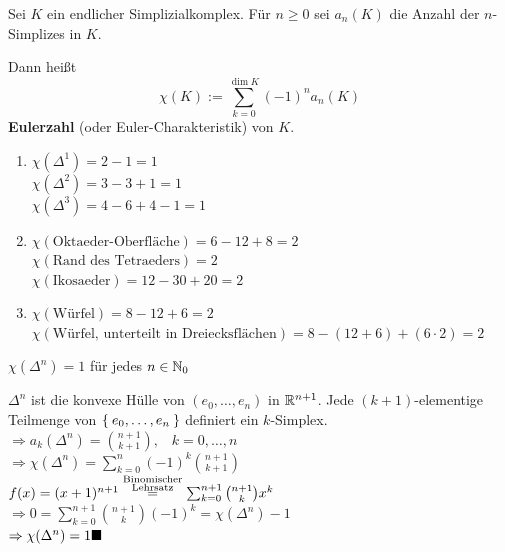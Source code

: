 \begin{definition}
    Sei $K$ ein endlicher Simplizialkomplex. Für $n \geq 0$ sei
    $a_n(K)$ die Anzahl der $n$-Simplizes in $K$.

    Dann heißt 
    \[\chi(K) := \sum_{k=0}^{\dim K} (-1)^n a_n(K)\]
    \textbf{Eulerzahl} (oder Euler-Charakteristik)
    von $K$.
\end{definition}

\begin{beispiel}
    \begin{enumerate}[label=\arabic*)]
        \item $\chi(\Delta^1) = 2 - 1 = 1$\\
              $\chi(\Delta^2) = 3 - 3 + 1 = 1$\\
              $\chi(\Delta^3) = 4 - 6 + 4 - 1 = 1$
        \item $\chi(\text{Oktaeder-Oberfläche}) = 6 - 12 + 8 = 2$\\
              $\chi(\text{Rand des Tetraeders}) = 2$\\
              $\chi(\text{Ikosaeder}) = 12 - 30 + 20 = 2$
        \item $\chi(\text{Würfel}) = 8 - 12 + 6 = 2$\\
              $\chi(\text{Würfel, unterteilt in Dreiecksflächen}) = 8 - (12 + 6) + (6 \cdot 2) = 2$
    \end{enumerate}
\end{beispiel}

\begin{korollar}
    $\chi(\Delta^n) = 1$ für jedes $n \in \mathbb{N}_0$
\end{korollar}

\begin{beweis}
    $\Delta^n$ ist die konvexe Hülle von $(e_0, \dots, e_n)$ in $\mathbb{R}^{n+1}$.
    Jede $(k+1)$-elementige Teilmenge von $\Set{e_0, \dots, e_n}$
    definiert ein $k$-Simplex.\\
    $\Rightarrow a_k(\Delta^n) = \binom{n+1}{k+1}, \;\;\; k = 0, \dots, n$\\
    $\Rightarrow \chi(\Delta^n) = \sum_{k=0}^n (-1)^k \binom{n+1}{k+1}$\\
    $f(x) = (x+1)^{n+1} \stackrel{\substack{\tiny\text{Binomischer}\\\text{Lehrsatz}}}{=} \sum_{k=0}^{n+1} \binom{n+1}{k} x^k$\\
    $\Rightarrow 0 = \sum_{k=0}^{n+1} \binom{n+1}{k} (-1)^k = \chi(\Delta^n) -1$\\
    $\Rightarrow \chi(\Delta^n) = 1 \qed$
\end{beweis}


